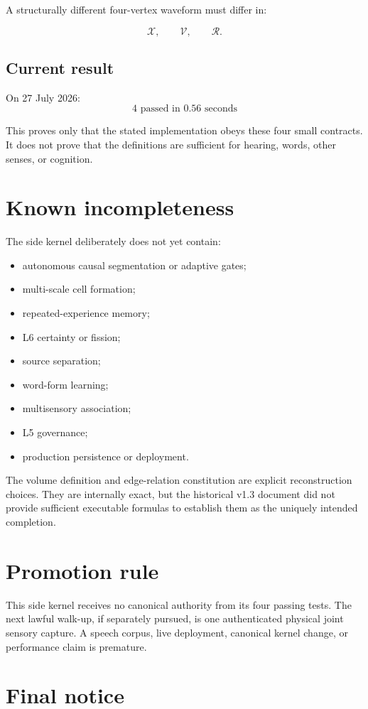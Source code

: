\documentclass[11pt]{article}
\newcommand{\Volume}{\mathcal{V}}
\newcommand{\Relation}{\mathcal{R}}
\begin{document}
A structurally different four-vertex waveform must differ in:

\[
  \mathcal{X},\qquad
  \Volume,\qquad
  \Relation.
\]

\subsection{Current result}

On 27 July 2026:
\[
  \boxed{\text{4 passed in 0.56 seconds}}
\]

This proves only that the stated implementation obeys these four small
contracts. It does not prove that the definitions are sufficient for hearing,
words, other senses, or cognition.

\section{Known incompleteness}

The side kernel deliberately does not yet contain:

\begin{itemize}
  \item autonomous causal segmentation or adaptive gates;
  \item multi-scale cell formation;
  \item repeated-experience memory;
  \item L6 certainty or fission;
  \item source separation;
  \item word-form learning;
  \item multisensory association;
  \item L5 governance;
  \item production persistence or deployment.
\end{itemize}

The volume definition and edge-relation constitution are explicit
reconstruction choices. They are internally exact, but the historical v1.3
document did not provide sufficient executable formulas to establish them as
the uniquely intended completion.

\section{Promotion rule}

This side kernel receives no canonical authority from its four passing tests.
The next lawful walk-up, if separately pursued, is one authenticated physical
joint sensory capture. A speech corpus, live deployment, canonical kernel
change, or performance claim is premature.

\section{Final notice}

\begin{center}
\end{center}
\end{document}

